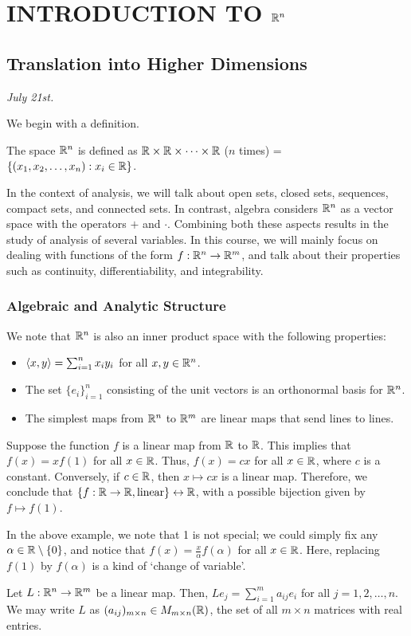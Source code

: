 \chapter{INTRODUCTION TO $\mathbb{R}^{n}$}

\section{Translation into Higher Dimensions}
\textit{July 21st.}

We begin with a definition.
\begin{definition}
    The space $\mathbb{R}^{n}$ is defined as $\mathbb{R} \times \mathbb{R} \times \cdots \times \mathbb{R}$ ($n$ times) = $\{(x_{1},x_{2},\ldots,x_{n}) : x_{i} \in \mathbb{R}\}$.
\end{definition}
In the context of analysis, we will talk about open sets, closed sets, sequences, compact sets, and connected sets. In contrast, algebra considers $\mathbb{R}^{n}$ as a vector space with the operators $+$ and $\cdot$. Combining both these aspects results in the study of analysis of several variables. In this course, we will mainly focus on dealing with functions of the form $f: \mathbb{R}^{n} \to \mathbb{R}^{m}$, and talk about their properties such as continuity, differentiability, and integrability.

\subsection{Algebraic and Analytic Structure}
We note that $\mathbb{R}^{n}$ is also an inner product space with the following properties:
\begin{itemize}
    \item $\langle x,y\rangle = \sum_{i=1}^{n} x_{i}y_{i}$ for all $x,y \in \mathbb{R}^{n}$.
    \item The set $\{e_{i}\}_{i=1}^{n}$ consisting of the unit vectors is an orthonormal basis for $\mathbb{R}^{n}$.
    \item The simplest maps from $\mathbb{R}^{n}$ to $\mathbb{R}^{m}$ are linear maps that send lines to lines.
\end{itemize}

\begin{example}
    Suppose the function $f$ is a linear map from $\mathbb{R}$ to $\mathbb{R}$. This implies that $f(x) = xf(1)$ for all $x \in \mathbb{R}$. Thus, $f(x) = cx$ for all $x \in \mathbb{R}$, where $c$ is a constant. Conversely, if $c \in \mathbb{R}$, then $x \mapsto cx$ is a linear map. Therefore, we conclude that $\{f: \mathbb{R} \to \mathbb{R}, \text{linear}\} \leftrightarrow \mathbb{R}$, with a possible bijection given by $f \mapsto f(1)$.
\end{example}
In the above example, we note that 1 is not special; we could simply fix any $\alpha \in \mathbb{R}\setminus\{0\}$, and notice that $f(x) = \frac{x}{\alpha} f(\alpha)$ for all $x \in \mathbb{R}$. Here, replacing $f(1)$ by $f(\alpha)$ is a kind of `change of variable'.
\begin{remark}
    Let $L:\mathbb{R}^{n} \to \mathbb{R}^{m}$ be a linear map. Then, $Le_{j} = \sum_{i=1}^{m} a_{ij} e_{i}$ for all $j = 1,2,\ldots,n$. We may write $L$ as $(a_{ij})_{m \times n} \in M_{m \times n}(\mathbb{R})$, the set of all $m \times n$ matrices with real entries.
\end{remark}

